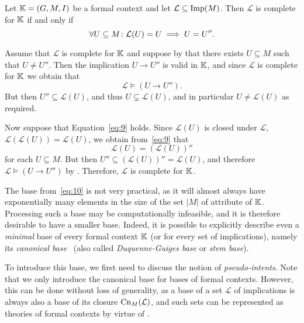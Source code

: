 \begin{Lemma}
  \label{lem:characterization-of-completeness}
  Let ${\mathbb{K}} = (G, M, I)$ be a formal context and let $\mathcal{L} \subseteq \operatorname{Imp}(M)$.
  Then $\mathcal{L}$ is complete for ${\mathbb{K}}$ if and only if
  \begin{equation}
    \label{eq:9}
    \forall U \subseteq M \colon \mathcal{L}(U) = U \implies U = U''.
  \end{equation}
\end{Lemma}
\begin{Proof}
  Assume that $\mathcal{L}$ is complete for ${\mathbb{K}}$ and suppose by that there exists $U
  \subseteq M$ such that $U \neq U''$.  Then the implication $U \to U''$ is valid in ${\mathbb{K}}$, and since $\mathcal{L}$ is complete for ${\mathbb{K}}$ we obtain that
  \begin{equation*}
    \mathcal{L} \models (U \to U'').
  \end{equation*}
  But then $U'' \subseteq \mathcal{L}(U)$, and thus $U \subsetneq \mathcal{L}(U)$, and in
  particular $U \neq \mathcal{L}(U)$ as required.

  Now suppose that Equation~\eqref{eq:9} holds.  Since $\mathcal{L}(U)$ is closed under
  $\mathcal{L}$, \ie $\mathcal{L}(\mathcal{L}(U)) = \mathcal{L}(U)$, we obtain
  from~\eqref{eq:9} that
  \begin{equation*}
    \mathcal{L}(U) = (\mathcal{L}(U))''
  \end{equation*}
  for each $U \subseteq M$.  But then $U'' \subseteq (\mathcal{L}(U))'' = \mathcal{L}(U)$,
  and therefore $\mathcal{L} \models (U \to U'')$ by
  .
  Therefore, $\mathcal{L}$ is complete for ${\mathbb{K}}$.
\end{Proof}

The base from~\eqref{eq:10} is not very practical, as it will almost always have
exponentially many elements in the size of the set $|M|$ of attribute of ${\mathbb{K}}$.
Processing such a base may be computationally infeasible, and it is therefore desirable to
have a smaller base.  Indeed, it is possible to explicitly describe even a \emph{minimal}
base of every formal context ${\mathbb{K}}$ (or for every set of implications), namely its
\emph{canonical base}~\cite{fca:DuquenneGuigues:1986,DBLP:books/cs/Maier83} (also called
\emph{Duquenne-Guiges base} or \emph{stem base}).

To introduce this base, we first need to discuss the notion of \emph{pseudo-intents}.
Note that we only introduce the canonical base for bases of formal contexts.  However,
this can be done without loss of generality, as a base of a set $\mathcal{L}$ of
implications is always also a base of its closure $\operatorname{Cn}_M(\mathcal{L})$, and such sets can
be represented as theories of formal contexts by virtue of
.

